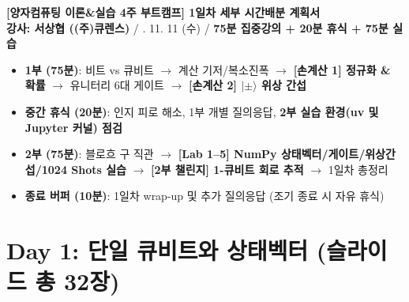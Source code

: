 \documentclass[a4paper,10pt]{article}
\newcommand{\ket}[1]{|#1\rangle}
\begin{document}
\begin{center}
    {\textbf{\Large [양자컴퓨팅 이론\&실습 4주 부트캠프] 1일차 세부 시간배분 계획서}}\\[0.25em]
    \textbf{강사: 서상협 ((주)큐렌스)} \quad / . 11. 11 (수) \quad / \quad \textbf{75분 집중강의 + 20분 휴식 + 75분 실습}
\end{center}
\vspace{-0.2cm}

\begin{tcolorbox}[colback=qcLightBlue, colframe=qcDarkBlue, title=\textbf{Day 1 운영 구조: [1부 75분 강의/손계산] + [20분 휴식] + [2부 75분 실습] + [10분 버퍼]}]
\small
\begin{itemize}
    \item \textbf{1부 (75분)}: 비트 vs 큐비트 $\to$ 계산 기저/복소진폭 $\to$ \textbf{[손계산 1] 정규화 \& 확률} $\to$ 유니터리 6대 게이트 $\to$ \textbf{[손계산 2] $\ket{\pm}$ 위상 간섭}
    \item \textbf{중간 휴식 (20분)}: 인지 피로 해소, 1부 개별 질의응답, \textbf{2부 실습 환경(uv 및 Jupyter 커널) 점검}
    \item \textbf{2부 (75분)}: 블로흐 구 직관 $\to$ \textbf{[Lab 1--5] NumPy 상태벡터/게이트/위상간섭/1024 Shots 실습} $\to$ \textbf{[2부 챌린지] 1-큐비트 회로 추적} $\to$ 1일차 총정리
    \item \textbf{종료 버퍼 (10분)}: 1일차 wrap-up 및 추가 질의응답 (조기 종료 시 자유 휴식)
\end{itemize}
\end{tcolorbox}

\vspace{0.2cm}
\section*{Day 1: 단일 큐비트와 상태벡터 (슬라이드 총 32장)}
\end{document}
